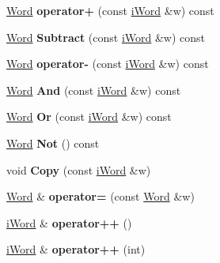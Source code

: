 \begin{DoxyCompactItemize}
\item 
\hypertarget{classWord_a0fa830d2d54ba68107d035c316b8d3ab}{
\hyperlink{classWord}{Word} {\bfseries operator+} (const \hyperlink{classiWord}{iWord} \&w) const }
\label{classWord_a0fa830d2d54ba68107d035c316b8d3ab}

\item 
\hypertarget{classWord_aef1af160cdcc631473aec52ea883e2e5}{
\hyperlink{classWord}{Word} {\bfseries Subtract} (const \hyperlink{classiWord}{iWord} \&w) const }
\label{classWord_aef1af160cdcc631473aec52ea883e2e5}

\item 
\hypertarget{classWord_af930dcccdcf2cdbb90df31ac61a4933c}{
\hyperlink{classWord}{Word} {\bfseries operator-\/} (const \hyperlink{classiWord}{iWord} \&w) const }
\label{classWord_af930dcccdcf2cdbb90df31ac61a4933c}

\item 
\hypertarget{classWord_a08eca1ca0af51daee452ba719f9407c5}{
\hyperlink{classWord}{Word} {\bfseries And} (const \hyperlink{classiWord}{iWord} \&w) const }
\label{classWord_a08eca1ca0af51daee452ba719f9407c5}

\item 
\hypertarget{classWord_a681da292897265ae47f144a99d49d9ec}{
\hyperlink{classWord}{Word} {\bfseries Or} (const \hyperlink{classiWord}{iWord} \&w) const }
\label{classWord_a681da292897265ae47f144a99d49d9ec}

\item 
\hypertarget{classWord_afdecfa9e3f2fda36496f249617a4cef5}{
\hyperlink{classWord}{Word} {\bfseries Not} () const }
\label{classWord_afdecfa9e3f2fda36496f249617a4cef5}

\item 
\hypertarget{classWord_a8c094d866fe9af5da5d32c98430a86f8}{
void {\bfseries Copy} (const \hyperlink{classiWord}{iWord} \&w)}
\label{classWord_a8c094d866fe9af5da5d32c98430a86f8}

\item 
\hypertarget{classWord_a437535c5c19c0ecfc01d52e2c297fe2c}{
\hyperlink{classWord}{Word} \& {\bfseries operator=} (const \hyperlink{classWord}{Word} \&w)}
\label{classWord_a437535c5c19c0ecfc01d52e2c297fe2c}

\item 
\hypertarget{classWord_a3837f49bcb44597e6d738ccb0eeed144}{
\hyperlink{classiWord}{iWord} \& {\bfseries operator++} ()}
\label{classWord_a3837f49bcb44597e6d738ccb0eeed144}

\item 
\hypertarget{classWord_ae921b75d263be790fd150c5962445163}{
\hyperlink{classiWord}{iWord} \& {\bfseries operator++} (int)}
\label{classWord_ae921b75d263be790fd150c5962445163}


\end{DoxyCompactItemize}
